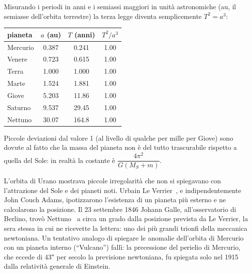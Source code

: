 \begin{Es}
  Misurando i periodi in anni e i semiassi maggiori in unità astronomiche (\si{\astronomicalunit}, il semiasse dell'orbita terrestre) la terza legge diventa semplicemente $T^2=a^3$:
  \begin{center}
    \begin{tabular}{lccc}
      \hline
      pianeta  & $a$ (\si{\astronomicalunit}) & $T$ (anni) & $T^2/a^3$ \\
      \hline
      Mercurio & 0.387                        & 0.241      & 1.00      \\
      Venere   & 0.723                        & 0.615      & 1.00      \\
      Terra    & 1.000                        & 1.000      & 1.00      \\
      Marte    & 1.524                        & 1.881      & 1.00      \\
      Giove    & 5.203                        & 11.86      & 1.00      \\
      Saturno  & 9.537                        & 29.45      & 1.00      \\
      Nettuno  & 30.07                        & 164.8      & 1.00      \\
      \hline
    \end{tabular}
  \end{center}
  Piccole deviazioni dal valore 1 (al livello di qualche per mille per Giove) sono dovute al fatto che la massa del pianeta non è del tutto trascurabile rispetto a quella del Sole: in realtà la costante è $\dfrac{4\pi^2}{G(M_S+m)}$.
\end{Es}

\begin{Es}
  L'orbita di Urano mostrava piccole irregolarità che non si spiegavano con l'attrazione del Sole e dei pianeti noti. Urbain Le Verrier~\cite{leverrier1846}, e indipendentemente John Couch Adams, ipotizzarono l'esistenza di un pianeta più esterno e ne calcolarono la posizione. Il 23 settembre 1846 Johann Galle, all'osservatorio di Berlino, trovò Nettuno~\cite{galle1846} a circa un grado dalla posizione prevista da Le Verrier, la sera stessa in cui ne ricevette la lettera: uno dei più grandi trionfi della meccanica newtoniana. Un tentativo analogo di spiegare le anomalie dell'orbita di Mercurio con un pianeta interno (``Vulcano'') fallì: la precessione del perielio di Mercurio, che eccede di \ang{;;43} per secolo la previsione newtoniana, fu spiegata solo nel 1915 dalla relatività generale di Einstein.
\end{Es}


